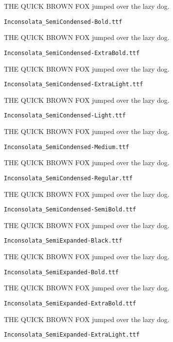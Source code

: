 \documentclass{article}
\begin{document}
THE QUICK BROWN FOX jumped over the lazy dog.

\setmainfont[Extension=.ttf]{Inconsolata_SemiCondensed-Bold}
\noindent \verb!Inconsolata_SemiCondensed-Bold.ttf!

THE QUICK BROWN FOX jumped over the lazy dog.

\setmainfont[Extension=.ttf]{Inconsolata_SemiCondensed-ExtraBold}
\noindent \verb!Inconsolata_SemiCondensed-ExtraBold.ttf!

THE QUICK BROWN FOX jumped over the lazy dog.

\setmainfont[Extension=.ttf]{Inconsolata_SemiCondensed-ExtraLight}
\noindent \verb!Inconsolata_SemiCondensed-ExtraLight.ttf!

THE QUICK BROWN FOX jumped over the lazy dog.

\setmainfont[Extension=.ttf]{Inconsolata_SemiCondensed-Light}
\noindent \verb!Inconsolata_SemiCondensed-Light.ttf!

THE QUICK BROWN FOX jumped over the lazy dog.

\setmainfont[Extension=.ttf]{Inconsolata_SemiCondensed-Medium}
\noindent \verb!Inconsolata_SemiCondensed-Medium.ttf!

THE QUICK BROWN FOX jumped over the lazy dog.

\setmainfont[Extension=.ttf]{Inconsolata_SemiCondensed-Regular}
\noindent \verb!Inconsolata_SemiCondensed-Regular.ttf!

THE QUICK BROWN FOX jumped over the lazy dog.

\setmainfont[Extension=.ttf]{Inconsolata_SemiCondensed-SemiBold}
\noindent \verb!Inconsolata_SemiCondensed-SemiBold.ttf!

THE QUICK BROWN FOX jumped over the lazy dog.

\setmainfont[Extension=.ttf]{Inconsolata_SemiExpanded-Black}
\noindent \verb!Inconsolata_SemiExpanded-Black.ttf!

THE QUICK BROWN FOX jumped over the lazy dog.

\setmainfont[Extension=.ttf]{Inconsolata_SemiExpanded-Bold}
\noindent \verb!Inconsolata_SemiExpanded-Bold.ttf!

THE QUICK BROWN FOX jumped over the lazy dog.

\setmainfont[Extension=.ttf]{Inconsolata_SemiExpanded-ExtraBold}
\noindent \verb!Inconsolata_SemiExpanded-ExtraBold.ttf!

THE QUICK BROWN FOX jumped over the lazy dog.

\setmainfont[Extension=.ttf]{Inconsolata_SemiExpanded-ExtraLight}
\noindent \verb!Inconsolata_SemiExpanded-ExtraLight.ttf!
\end{document}
